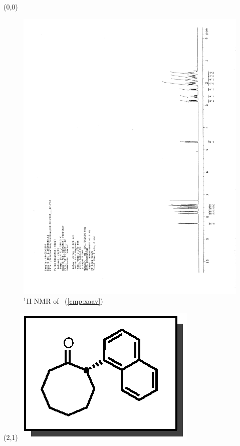 \begin{textblock}{20}(0,0)
\begin{figure}[htb]
\caption{$^1$H NMR of \CMPxaav\ (\ref{cmp:xaav})}
\includegraphics[scale=0.75, trim = 0mm 0mm 0mm 5mm,
clip]{chp_asymmetric/images/nmr/xaavH}
\vspace{-100pt}
\end{figure}
\end{textblock}
\begin{textblock}{1}(2,1)
\includegraphics[scale=0.8, angle=90]{chp_asymmetric/images/xaav}
\end{textblock}
